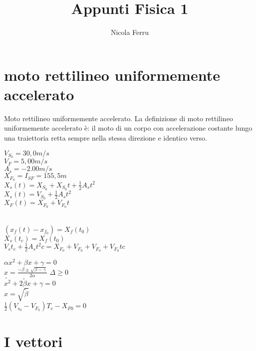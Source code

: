 \documentclass{article}
\title{Appunti Fisica 1}
\author{Nicola Ferru}
\date{}
\begin{document}
\maketitle
\section{moto rettilineo uniformemente accelerato}
Moto rettilineo uniformemente accelerato. La definizione di moto rettilineo uniformemente accelerato è: il moto di un corpo con accelerazione costante lungo una traiettoria retta sempre nella stessa direzione e identico verso.
\begin{multicols}{3} 
$V_{S_0}=30,0m/s$\\
$V_F=5,00m/s$\\
$A_s=-2.00m/s$\\
$X_{F_0}=I_{SF}=155,5m$\\
$X_s(t)=X_{S_0}+X_{S_0}t+\frac{1}{2}A_st^2$\\
$X_s(t)=V_{S_0}+\frac{1}{2}A_st^2$\\
$X_F(t)=X_{F_0}+V_{F_0}t$
\end{multicols}
\begin{multicols}{2} 
 \\
  $(x_f(t)-x_{f_0})=X_{f}(t_0)$\\
  $X_s(t_c)=X_f(t_0)$\\
  $V_st_e+\frac{1}{2}A_st^2c=X_{F_0}+V_{F_0}+V_{F_0}+V_{F_0}tc$
\end{multicols}
$\alpha{x^2}+\beta{x}+\gamma=0$\\
$x=\frac{-\beta\pm\sqrt{\beta-\gamma}}{2\alpha}$ $\Delta\geq 0$\\
$\tilde{x^2}+\tilde{2\beta x}+\gamma=0$\\
$x=\sqrt{\tilde{\beta}}$\\
$\frac{1}{2}(V_{s_0}-V_{F_0})T_c-X_{F0}=0$\\
\section{I vettori}
\end{document}
